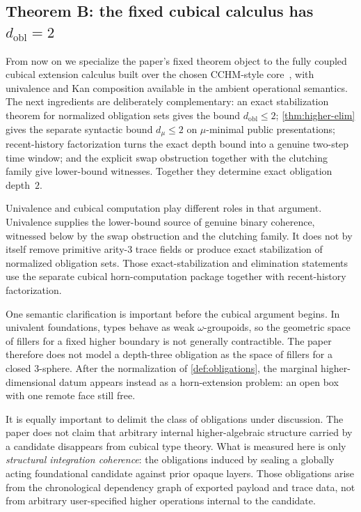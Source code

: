 \documentclass{lmcs}
\begin{document}
\subsection{\texorpdfstring{Theorem B: the fixed cubical calculus has $d_{\mathrm{obl}}=2$}{Theorem B: the fixed cubical calculus has d obl = 2}}

From now on we specialize the paper's fixed theorem object to the fully coupled cubical extension calculus built over the chosen CCHM-style core~\cite{cubical,cchm-hits}, with univalence and Kan composition available in the ambient operational semantics. The next ingredients are deliberately complementary: an exact stabilization theorem for normalized obligation sets gives the bound $d_{\mathrm{obl}} \leq 2$; \autoref{thm:higher-elim} gives the separate syntactic bound $d_\mu \leq 2$ on $\mu$-minimal public presentations; recent-history factorization turns the exact depth bound into a genuine two-step time window; and the explicit swap obstruction together with the clutching family give lower-bound witnesses. Together they determine exact obligation depth~$2$.

Univalence and cubical computation play different roles in that argument. Univalence supplies the lower-bound source of genuine binary coherence, witnessed below by the swap obstruction and the clutching family. It does not by itself remove primitive arity-$3$ trace fields or produce exact stabilization of normalized obligation sets. Those exact-stabilization and elimination statements use the separate cubical horn-computation package together with recent-history factorization.

One semantic clarification is important before the cubical argument begins. In univalent foundations, types behave as weak $\omega$-groupoids, so the geometric space of fillers for a fixed higher boundary is not generally contractible. The paper therefore does not model a depth-three obligation as the space of fillers for a closed $3$-sphere. After the normalization of \autoref{def:obligations}, the marginal higher-dimensional datum appears instead as a horn-extension problem: an open box with one remote face still free.

It is equally important to delimit the class of obligations under discussion. The paper does not claim that arbitrary internal higher-algebraic structure carried by a candidate disappears from cubical type theory. What is measured here is only \emph{structural integration coherence}: the obligations induced by sealing a globally acting foundational candidate against prior opaque layers. Those obligations arise from the chronological dependency graph of exported payload and trace data, not from arbitrary user-specified higher operations internal to the candidate.
\end{document}
